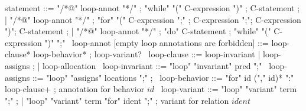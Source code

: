 \begin{syntax}
  statement ::= "/*@" loop-annot "*/" ;
  "while" "(" C-expression ")" ;
  C-statement ;
  | "/*@" loop-annot "*/" ;
  "for" "(" C-expression ";" ;
  C-expression ";";
  C-expression ")";
  C-statement ;
  | "/*@" loop-annot "*/" ;
  "do" C-statement ;
  "while" "(" C-expression ")" ";"
  \
  loop-annot [empty loop annotations are forbidden] ::= loop-clause* loop-behavior* ;
                 loop-variant?
  \
  loop-clause ::= loop-invariant | loop-assigns ;
                | loop-allocation
  \
  loop-invariant ::= "loop" "invariant" pred ";" 
  \
  loop-assigns ::= "loop" "assigns" locations ";" ;
  \
  loop-behavior ::= "for" id ("," id)* ":" loop-clause+ ; annotation for behavior $id$
  \
  loop-variant ::= "loop" "variant" term ";" ;
  | "loop" "variant" term "for" ident ";" ; variant for relation $ident$
\end{syntax}
